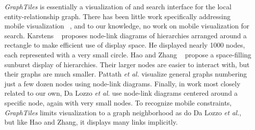\textit{GraphTiles} is essentially a visualization of and search interface for the local entity-relationship graph. There has been little work specifically addressing mobile visualization ~\cite{RefWorks:658}, and to our knowledge, no work on mobile visualization for search. Karstens ~\cite{RefWorks:908} proposes node-link diagrams of hierarchies arranged around a rectangle to make efficient use of display space. He displayed nearly 1000 nodes, each represented with a very small circle. Hao and Zhang ~\cite{RefWorks:906} propose a space-filling sunburst display of hierarchies. Their larger nodes are easier to interact with, but their graphs are much smaller. Pattath \textit{et al.}  \cite{RefWorks:896} visualize general graphs numbering just a few dozen nodes using node-link diagrams. Finally, in work most closely related to our own, Da Lozzo \textit{et al.}\cite{springerlink:10.1007/978-3-642-18469-7-14} use node-link diagrams centered around a specific node, again with very small nodes. To recognize mobile constraints, \textit{GraphTiles} limits visualization to a graph neighborhood as do Da Lozzo \textit{et al.}, but like Hao and Zhang, it displays many links implicitly.